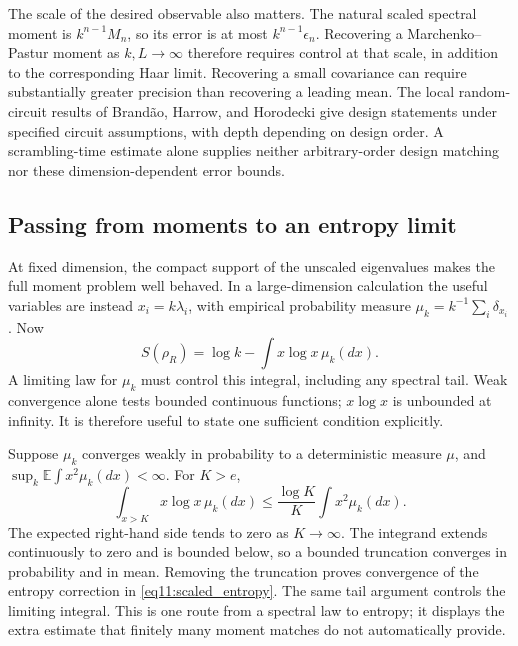 \documentclass[11pt,letterpaper]{article}
\theoremstyle{plain}
\theoremstyle{definition}
\theoremstyle{remark}
\newcommand{\E}{\mathbb{E}}
\begin{document}
The scale of the desired observable also matters. The natural scaled
spectral moment is $k^{n-1}M_n$, so its error is at most
$k^{n-1}\epsilon_n$. Recovering a Marchenko--Pastur moment as
$k,L\to\infty$ therefore requires control at that scale, in addition
to the corresponding Haar limit. Recovering a small covariance can
require substantially greater precision than recovering a leading mean.
The local random-circuit results of Brand\~ao, Harrow, and Horodecki
\citep{brandaoetal2016} give design statements under specified circuit
assumptions, with depth depending on design order. A scrambling-time
estimate alone supplies neither arbitrary-order design matching nor
these dimension-dependent error bounds.

\subsection{Passing from moments to an entropy limit}
\label{subsec11:level_three}

At fixed dimension, the compact support of the unscaled eigenvalues
makes the full moment problem well behaved. In a large-dimension
calculation the useful variables are instead $x_i=k\lambda_i$, with
empirical probability measure
$\mu_k=k^{-1}\sum_i\delta_{x_i}$. Now
\begin{equation}
 S(\rho_R)=\log k-\int x\log x\,\mu_k(dx).
 \label{eq11:scaled_entropy}
\end{equation}
A limiting law for $\mu_k$ must control this integral, including any
spectral tail. Weak convergence alone tests bounded continuous functions;
$x\log x$ is unbounded at infinity. It is therefore useful to state
one sufficient condition explicitly.

Suppose $\mu_k$ converges weakly in probability to a deterministic
measure $\mu$, and
$\sup_k\E\int x^2\mu_k(dx)<\infty$. For $K>e$,
\begin{equation}
 \int_{x>K}x\log x\,\mu_k(dx)
 \leq\frac{\log K}{K}\int x^2\mu_k(dx).
 \label{eq11:tail_bound}
\end{equation}
The expected right-hand side tends to zero as $K\to\infty$.
The integrand extends continuously to zero and is bounded below, so a
bounded truncation converges in probability and in mean. Removing the
truncation proves convergence of the entropy correction in
\eqref{eq11:scaled_entropy}. The same tail argument controls the
limiting integral. This is one route from a spectral law to entropy;
it displays the extra estimate that finitely many moment matches do
not automatically provide.
\end{document}

